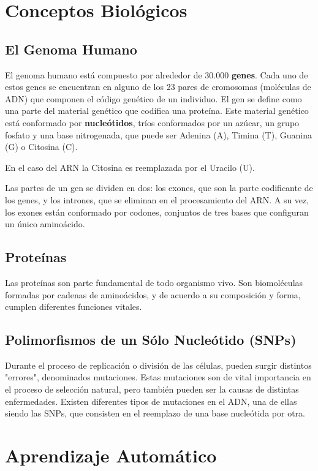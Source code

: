\section{Conceptos Biológicos}

\subsection{El Genoma Humano}

El genoma humano está compuesto por alrededor de 30.000 \textbf{genes}. Cada uno de estos genes se encuentran en alguno de los 23 pares de cromosomas (moléculas de ADN) que componen el código genético de un individuo. 
El gen se define como una parte del material genético que codifica una proteína. Este material genético está conformado por \textbf{nucleótidos}, tríos conformados por un azúcar, un grupo fosfato y una base nitrogenada, que puede ser Adenina (A), Timina (T), Guanina (G) o Citosina (C). 


En el caso del ARN la Citosina es reemplazada por el Uracilo (U).

Las partes de un gen se dividen en dos: los exones, que son la parte codificante de los genes, y los intrones, que se eliminan en el procesamiento del ARN. 
A su vez, los exones están conformado por codones, conjuntos de tres bases que configuran un único aminoácido. 


\subsection{Proteínas}

Las proteínas son parte fundamental de todo organismo vivo. Son biomoléculas formadas por cadenas de aminoácidos, y de acuerdo a su composición y forma, cumplen diferentes funciones vitales.

\subsection{Polimorfismos de un Sólo Nucleótido (SNPs)}

Durante el proceso de replicación o división de las células, pueden surgir distintos "errores", denominados mutaciones. Estas mutaciones son de vital importancia en el proceso de selección natural, pero también pueden ser la causas de distintas enfermedades. Existen diferentes tipos de mutaciones en el ADN, una de ellas siendo las SNPs, que consisten en el reemplazo de una base nucleótida por otra.


\section{Aprendizaje Automático}

